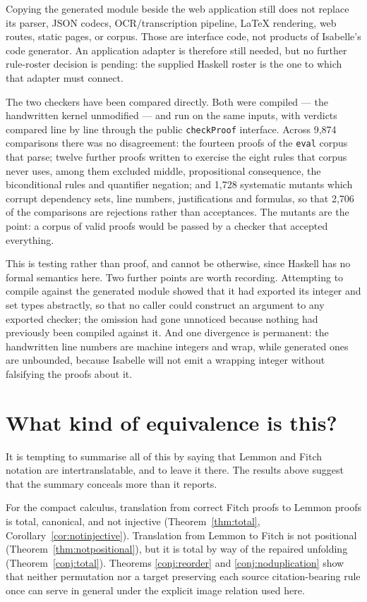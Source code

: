 \documentclass[11pt]{article}
\theoremstyle{plain}
\theoremstyle{definition}
\theoremstyle{remark}
\begin{document}
Copying the generated module beside the web application still does not replace
its parser, JSON codecs, OCR/transcription pipeline, LaTeX rendering, web
routes, static pages, or corpus. Those are interface code, not products of
Isabelle's code generator. An application adapter is therefore still needed,
but no further rule-roster decision is pending: the supplied Haskell roster is
the one to which that adapter must connect.

The two checkers have been compared directly. Both were compiled --- the
handwritten kernel unmodified --- and run on the same inputs, with verdicts
compared line by line through the public \verb|checkProof| interface. Across
9{,}874 comparisons there was no disagreement: the fourteen proofs of the
\verb|eval| corpus that parse; twelve further proofs written to exercise the
eight rules that corpus never uses, among them excluded middle, propositional
consequence, the biconditional rules and quantifier negation; and 1{,}728
systematic mutants which corrupt dependency sets, line numbers, justifications
and formulas, so that 2{,}706 of the comparisons are rejections rather than
acceptances. The mutants are the point: a corpus of valid proofs would be
passed by a checker that accepted everything.

This is testing rather than proof, and cannot be otherwise, since Haskell has
no formal semantics here. Two further points are worth recording. Attempting
to compile against the generated module showed that it had exported its
integer and set types abstractly, so that no caller could construct an
argument to any exported checker; the omission had gone unnoticed because
nothing had previously been compiled against it. And one divergence is
permanent: the handwritten line numbers are machine integers and wrap, while
generated ones are unbounded, because Isabelle will not emit a wrapping
integer without falsifying the proofs about it.

\section{What kind of equivalence is this?}\label{sec:equivalence}

It is tempting to summarise all of this by saying that Lemmon and Fitch
notation are intertranslatable, and to leave it there. The results above
suggest that the summary conceals more than it reports.

For the compact calculus, translation from correct Fitch proofs to Lemmon
proofs is total, canonical,
and not injective (Theorem~\ref{thm:total},
Corollary~\ref{cor:notinjective}). Translation from Lemmon to Fitch is not
positional (Theorem~\ref{thm:notpositional}), but it is total by way of the
repaired unfolding (Theorem~\ref{conj:total}). Theorems
\ref{conj:reorder} and \ref{conj:noduplication} show that neither permutation
nor a target preserving each source citation-bearing rule once can serve in
general under the explicit image relation used here.
\end{document}
